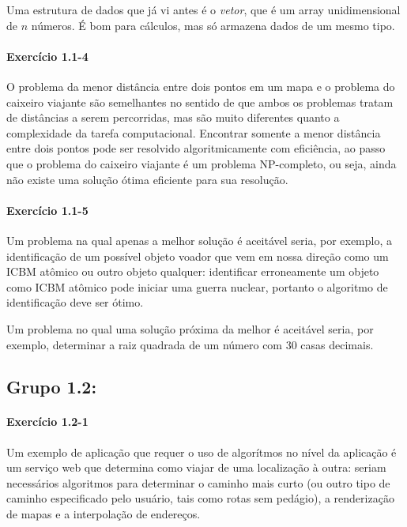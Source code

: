 \documentclass[pdftex,a4paper,12pt,brazil]{article} %
\begin{document}
Uma estrutura de dados que já vi antes é o \emph{vetor}, que é um array
unidimensional de $n$ números. É bom para cálculos, mas só armazena dados de um mesmo tipo.

\paragraph{Exercício 1.1-4}

O problema da menor distância entre dois pontos em um mapa e o problema
do caixeiro viajante são semelhantes no sentido de que ambos os problemas tratam de
distâncias a serem percorridas, mas são muito diferentes quanto a complexidade da tarefa
computacional. Encontrar somente a menor distância entre dois pontos pode ser resolvido
algoritmicamente com eficiência, ao passo que o problema do caixeiro viajante é um problema
NP-completo, ou seja, ainda não existe uma solução ótima eficiente para sua resolução.

\paragraph{Exercício 1.1-5}

Um problema na qual apenas a melhor solução é aceitável seria, por exemplo,
a identificação de um possível objeto voador que vem em nossa direção como um ICBM atômico
ou outro objeto qualquer: identificar erroneamente um objeto como ICBM atômico pode iniciar
uma guerra nuclear, portanto o algoritmo de identificação deve ser ótimo.

Um problema no qual uma solução próxima da melhor é aceitável seria, por exemplo,
determinar a raiz quadrada de um número com 30 casas decimais.

\subsection{Grupo 1.2:}
\label{grupo_1_2}

\paragraph{Exercício 1.2-1}

Um exemplo de aplicação que requer o uso de algorítmos no nível da aplicação é um serviço
web que determina como viajar de uma localização à outra: seriam necessários algoritmos
para determinar o caminho mais curto (ou outro tipo de caminho especificado pelo usuário,
tais como rotas sem pedágio), a renderização de mapas e a interpolação de endereços.
\end{document}
